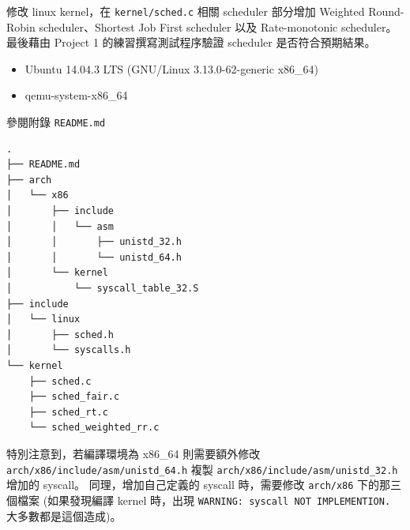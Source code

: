 \documentclass{res}
\begin{document}
 


\address{\\R03922106 蔡佑隆 unzledick@yahoo.com.tw\\ R04922067 楊翔雲 morris821028@gmail.com}

\begin{resume}

\vspace*{.1in} 

	修改 linux kernel，在 \lstinline{kernel/sched.c} 相關 scheduler 部分增加 Weighted Round-Robin scheduler、Shortest Job First scheduler 以及 Rate-monotonic scheduler。最後藉由 Project 1 的練習撰寫測試程序驗證 scheduler 是否符合預期結果。

\vspace*{.1in} 

\begin{itemize}
	\item Ubuntu 14.04.3 LTS (GNU/Linux 3.13.0-62-generic x86\_64)
	\item qemu-system-x86\_64
\end{itemize}


\vspace*{.1in} 

參閱附錄 \lstinline{README.md}

\vspace*{.1in} 

\begin{lstlisting}[style=ascii-tree]
.
├── README.md
├── arch
│   └── x86
│       ├── include
│       │   └── asm
│       │       ├── unistd_32.h
│       │       └── unistd_64.h
│       └── kernel
│           └── syscall_table_32.S
├── include
│   └── linux
│       ├── sched.h
│       └── syscalls.h
└── kernel
    ├── sched.c
    ├── sched_fair.c
    ├── sched_rt.c
    └── sched_weighted_rr.c
\end{lstlisting}


特別注意到，若編譯環境為 x86\_64 則需要額外修改 \lstinline{arch/x86/include/asm/unistd_64.h} 複製 \lstinline{arch/x86/include/asm/unistd_32.h} 增加的 syscall。 同理，增加自己定義的 syscall 時，需要修改 \lstinline{arch/x86} 下的那三個檔案 (如果發現編譯 kernel 時，出現 \lstinline{WARNING: syscall NOT IMPLEMENTION.} 大多數都是這個造成)。


\end{resume}
\end{document}
